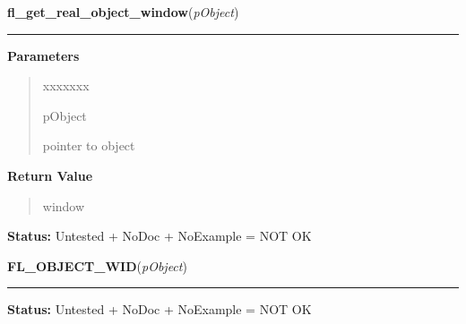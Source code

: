 \hspace{.8\funcindent}\begin{boxedminipage}{\funcwidth}

    \raggedright \textbf{fl\_get\_real\_object\_window}(\textit{pObject})

    \vspace{-1.5ex}

    \rule{\textwidth}{0.5\fboxrule}
\setlength{\parskip}{2ex}
\setlength{\parskip}{1ex}
      \textbf{Parameters}
      \vspace{-1ex}

      \begin{quote}
        \begin{Ventry}{xxxxxxx}

          \item[pObject]

          pointer to object

        \end{Ventry}

      \end{quote}

      \textbf{Return Value}
    \vspace{-1ex}

      \begin{quote}
      window

      \end{quote}

\textbf{Status:} Untested + NoDoc + NoExample = NOT OK



    \end{boxedminipage}

    \label{xformslib:library:FL_ObjWin}

    \vspace{0.5ex}

\hspace{.8\funcindent}\begin{boxedminipage}{\funcwidth}

    \raggedright \textbf{FL\_OBJECT\_WID}(\textit{pObject})

    \vspace{-1.5ex}

    \rule{\textwidth}{0.5\fboxrule}
\setlength{\parskip}{2ex}
\setlength{\parskip}{1ex}
\textbf{Status:} Untested + NoDoc + NoExample = NOT OK



    \end{boxedminipage}

